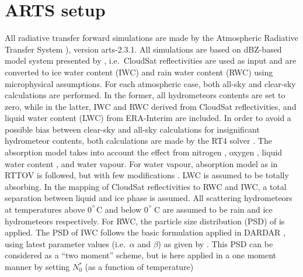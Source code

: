 \documentclass[amt, manuscript]{copernicus}
\begin{document}


\appendix
\section{ARTS setup}    %
\label{appendix:ARTS_setup}
%
All radiative transfer forward simulations are made by the Atmospheric Radiative
Transfer System \citep[ARTS,][]{eriksson:arts2:11,buehler:artst:18}), version
arts-2.3.1. All simulations are based on dBZ-based model system presented by \citet{ekelund2020using}, i.e.\ CloudSat reflectivities are used as input and are converted to ice water content (IWC) and rain water content (RWC) using microphysical assumptions. For each atmospheric case, both all-sky and clear-sky calculations are performed. In the former, all hydrometeors contents are set to zero, while in the latter, IWC and RWC derived from CloudSat reflectivities, and liquid water content (LWC) from ERA-Interim \citep{dee2011erainterim} are included. In order to avoid a possible bias between clear-sky and all-sky calculations for insignificant hydrometeor contents, both calculations are made by the RT4 solver \citep{evans1995microwavec}. The absorption model takes into account the effect from nitrogen
\citep{pwr:93}, oxygen \citep{pwr:93}, liquid water content \citep[LWC,][]{ellison2007permittivity}, and water vapour. For water vapour, absorption model as  in RTTOV \citep[Radiative transfer for TOVS,][]{saunders2018update} is followed, but with few modifications \citep{turner2019amsutran}. LWC is assumed to be totally absorbing. In the mapping of CloudSat reflectivities to RWC and IWC, a total separation between liquid and ice phase is assumed. All scattering hydrometeors at temperatures above 0$^{^{\circ}}$C  and below 0$^{^{\circ}}$\,C are assumed to be rain and ice hydrometeors respectively. For RWC, the particle size distribution (PSD) of \citet{abel2012improved} is applied. The PSD of IWC follows the basic formulation applied in DARDAR \citep[\url{
	http://www.icare.univ-lille1.fr/projects/dardar}][]{delanoe2008variational}, using latest parameter values (i.e.\ $\alpha$ and $\beta$) as given by \citet{cazenave2019evolution}.
This PSD can be considered as a ``two moment'' scheme, but is here applied in a one moment manner by setting $N_0^*$ (as a function of temperature)
\end{document}
